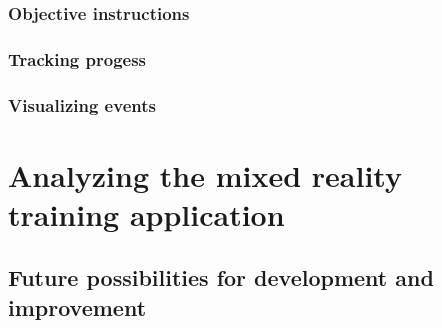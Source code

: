 \documentclass[12pt, a4paper,oneside, nocenter]{thesis}
\begin{document}
\subsection{Objective instructions}
\subsection{Tracking progess}
\subsection{Visualizing events}
\par
\chapter{\texorpdfstring{Analyzing the mixed reality training application}{analysis-mixedr}}

\section{Future possibilities for development and improvement}


\newpage

\nocite{*}

\end{document}
